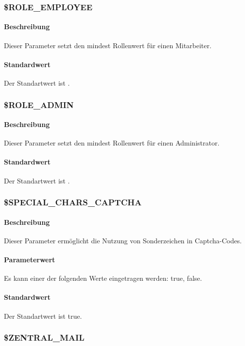 \subsubsection{\$ROLE\_EMPLOYEE}
\paragraph{Beschreibung}Dieser Parameter setzt den mindest Rollenwert für einen Mitarbeiter.
\paragraph{Standardwert}Der Standartwert ist {\grqq}.

\subsubsection{\$ROLE\_ADMIN}
\paragraph{Beschreibung}Dieser Parameter setzt den mindest Rollenwert für einen Administrator.
\paragraph{Standardwert}Der Standartwert ist {\grqq}.

\subsubsection{\$SPECIAL\_CHARS\_CAPTCHA}
\paragraph{Beschreibung}Dieser Parameter ermöglicht die Nutzung von Sonderzeichen in Captcha-Codes.
\paragraph{Parameterwert}Es kann einer der folgenden Werte eingetragen werden: {\glqq true\grqq}, {\glqq false\grqq}.
\paragraph{Standardwert}Der Standartwert ist {\glqq true\grqq}.

\subsubsection{\$ZENTRAL\_MAIL}
